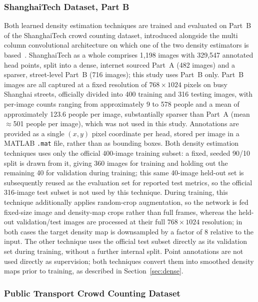 \subsubsection{ShanghaiTech Dataset, Part B}
Both learned density estimation techniques are trained and evaluated on Part~B of the ShanghaiTech crowd counting dataset, introduced alongside the multi column convolutional architecture on which one of the two density estimators is based~\cite{Zhu2020}. ShanghaiTech as a whole comprises 1{,}198 images with 329{,}547 annotated head points, split into a dense, internet sourced Part~A (482 images) and a sparser, street-level Part~B (716 images); this study uses Part~B only. Part~B images are all captured at a fixed resolution of $768{\times}1024$ pixels on busy Shanghai streets, officially divided into 400 training and 316 testing images, with per-image counts ranging from approximately 9 to 578 people and a mean of approximately 123.6 people per image, substantially sparser than Part~A (mean $\approx$501 people per image), which was not used in this study. Annotations are provided as a single $(x,y)$ pixel coordinate per head, stored per image in a MATLAB \texttt{.mat} file, rather than as bounding boxes. Both density estimation techniques uses only the official 400-image training subset: a fixed, seeded 90/10 split is drawn from it, giving 360 images for training and holding out the remaining 40 for validation during training; this same 40-image held-out set is subsequently reused as the evaluation set for reported test metrics, so the official 316-image test subset is not used by this technique. During training, this technique additionally applies random-crop augmentation, so the network is fed fixed-size image and density-map crops rather than full frames, whereas the held-out validation/test images are processed at their full $768{\times}1024$ resolution; in both cases the target density map is downsampled by a factor of 8 relative to the input. The other technique uses the official test subset directly as its validation set during training, without a further internal split. Point annotations are not used directly as supervision; both techniques convert them into smoothed density maps prior to training, as described in Section~\ref{sec:dense}.


\subsubsection{Public Transport Crowd Counting Dataset}
\label{sec:ptccd}

